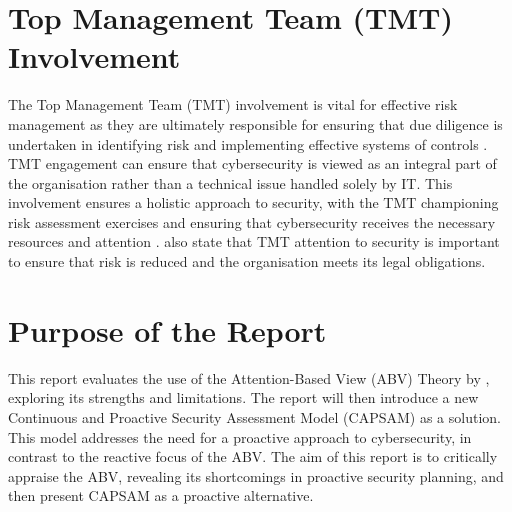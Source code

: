 \section{Top Management Team (TMT) Involvement}
The Top Management Team (TMT) involvement is vital for effective risk management as they are ultimately responsible for ensuring that due diligence is undertaken in identifying risk and implementing effective systems of controls \citep{fazlida2015information}. TMT engagement can ensure that cybersecurity is viewed as an integral part of the organisation rather than a technical issue handled solely by IT. This involvement ensures a holistic approach to security, with the TMT championing risk assessment exercises and ensuring that cybersecurity receives the necessary resources and attention \citep{shaikh2023information}. \citet{fazlida2015information} also state that TMT attention to security is important to ensure that risk is reduced and the organisation meets its legal obligations.

\section{Purpose of the Report}
This report evaluates the use of the Attention-Based View (ABV) Theory by \citet{shaikh2023information}, exploring its strengths and limitations. The report will then introduce a new Continuous and Proactive Security Assessment Model (CAPSAM) as a solution. This model addresses the need for a proactive approach to cybersecurity, in contrast to the reactive focus of the ABV. The aim of this report is to critically appraise the ABV, revealing its shortcomings in proactive security planning, and then present CAPSAM as a proactive alternative.

